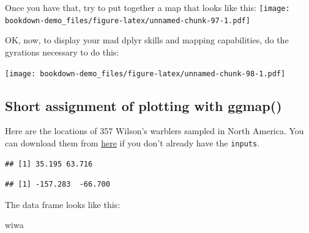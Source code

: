 \documentclass[]{book}
\newenvironment{Shaded}{\begin{snugshade}}{\end{snugshade}}
\newcommand{\KeywordTok}[1]{\textcolor[rgb]{0.13,0.29,0.53}{\textbf{{#1}}}}
\newcommand{\StringTok}[1]{\textcolor[rgb]{0.31,0.60,0.02}{{#1}}}
\newcommand{\CommentTok}[1]{\textcolor[rgb]{0.56,0.35,0.01}{\textit{{#1}}}}
\newcommand{\NormalTok}[1]{{#1}}
\theoremstyle{definition}
\theoremstyle{definition}
\theoremstyle{remark}
\begin{document}
Once you have that, try to put together a map that looks like this:
\texttt{[image: bookdown-demo\_files/figure-latex/unnamed-chunk-97-1.pdf]}

OK, now, to display your mad dplyr skills and mapping capabilities, do
the gyrations necessary to do this:

\texttt{[image: bookdown-demo\_files/figure-latex/unnamed-chunk-98-1.pdf]}

\subsection{Short assignment of plotting with
ggmap()}\label{short-assignment-of-plotting-with-ggmap}

Here are the locations of 357 Wilson's warblers sampled in North
America. You can download them from
\href{https://www.dropbox.com/s/fiq6zj0qsmj0dqa/breeding_wiwa_isotopes.rds?dl=1}{here}
if you don't already have the \texttt{inputs}.

\begin{Shaded}
\end{Shaded}

\begin{verbatim}
## [1] 35.195 63.716
\end{verbatim}

\begin{Shaded}
\end{Shaded}

\begin{verbatim}
## [1] -157.283  -66.700
\end{verbatim}

The data frame looks like this:

\begin{Shaded}
\begin{Highlighting}[]
\NormalTok{wiwa}
\end{Highlighting}
\end{Shaded}
\end{document}
